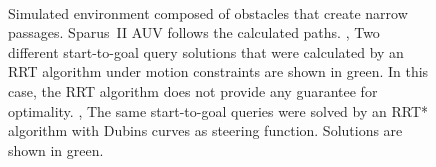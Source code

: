 \begin{figure}[htbp]
    \myfloatalign
     \quad
    \\
    \quad
\caption[Simulation of the Sparus~II AUV attempting to follow a solution path
calculated by an RRT and RRT* under motion constraints.]
{Simulated environment composed of obstacles that create narrow
passages. Sparus~II \ac{AUV} follows the calculated paths. 
\protect {}, \protect
{} Two different start-to-goal query solutions
that were calculated by an \ac{RRT} algorithm under motion constraints are shown
in green. In this case, the \ac{RRT} algorithm does not provide any guarantee
for optimality.
\protect {}, \protect
{} The same start-to-goal queries were
solved by an \ac{RRT*} algorithm with Dubins curves as steering function.
Solutions are shown in green.}
\label{fig:PlannKinodRRTQueries}
\end{figure}


